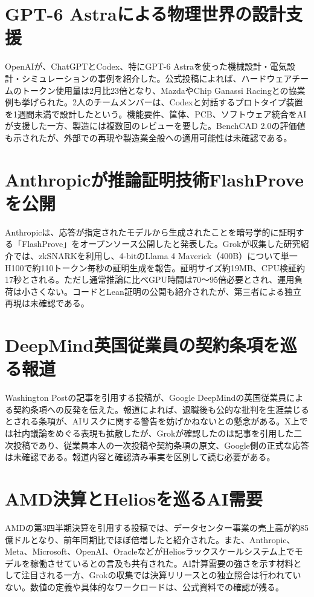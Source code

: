 \section{GPT-6 Astraによる物理世界の設計支援}
OpenAIが、ChatGPTとCodex、特にGPT-6 Astraを使った機械設計・電気設計・シミュレーションの事例を紹介した。公式投稿によれば、ハードウェアチームのトークン使用量は2月比23倍となり、MazdaやChip Ganassi Racingとの協業例も挙げられた。2人のチームメンバーは、Codexと対話するプロトタイプ装置を1週間未満で設計したという。機能要件、筐体、PCB、ソフトウェア統合をAIが支援した一方、製造には複数回のレビューを要した。BenchCAD 2.0の評価値も示されたが、外部での再現や製造業全般への適用可能性は未確認である。

\section{Anthropicが推論証明技術FlashProveを公開}
Anthropicは、応答が指定されたモデルから生成されたことを暗号学的に証明する「FlashProve」をオープンソース公開したと発表した。Grokが収集した研究紹介では、zkSNARKを利用し、4-bitのLlama 4 Maverick（400B）について単一H100で約110トークン毎秒の証明生成を報告。証明サイズ約19MB、CPU検証約17秒とされる。ただし通常推論に比べGPU時間は70～95倍必要とされ、運用負荷は小さくない。コードとLean証明の公開も紹介されたが、第三者による独立再現は未確認である。

\section{DeepMind英国従業員の契約条項を巡る報道}
Washington Postの記事を引用する投稿が、Google DeepMindの英国従業員による契約条項への反発を伝えた。報道によれば、退職後も公的な批判を生涯禁じるとされる条項が、AIリスクに関する警告を妨げかねないとの懸念がある。X上では社内議論をめぐる表現も拡散したが、Grokが確認したのは記事を引用した二次投稿であり、従業員本人の一次投稿や契約条項の原文、Google側の正式な応答は未確認である。報道内容と確認済み事実を区別して読む必要がある。

\section{AMD決算とHeliosを巡るAI需要}
AMDの第3四半期決算を引用する投稿では、データセンター事業の売上高が約85億ドルとなり、前年同期比でほぼ倍増したと紹介された。また、Anthropic、Meta、Microsoft、OpenAI、OracleなどがHeliosラックスケールシステム上でモデルを稼働させているとの言及も共有された。AI計算需要の強さを示す材料として注目される一方、Grokの収集では決算リリースとの独立照合は行われていない。数値の定義や具体的なワークロードは、公式資料での確認が残る。

